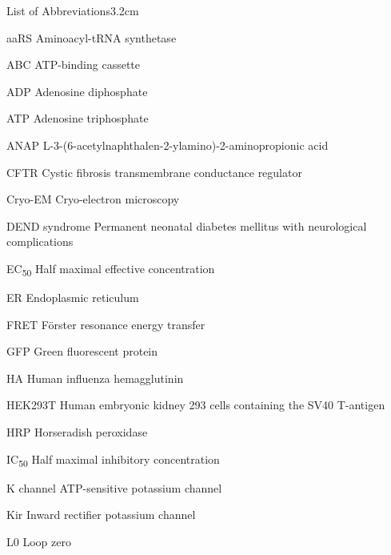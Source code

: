 \graphicspath{{figures/appendix/}}

\begin{mclistof}{List of Abbreviations}{3.2cm}

\item[aaRS] Aminoacyl-tRNA synthetase

\item[ABC] ATP-binding cassette

\item[ADP] Adenosine diphosphate

\item[ATP] Adenosine triphosphate

\item[ANAP] L-3-(6-acetylnaphthalen-2-ylamino)-2-aminopropionic acid

\item[CFTR] Cystic fibrosis transmembrane conductance regulator

\item[Cryo-EM] Cryo-electron microscopy

\item[DEND syndrome] Permanent neonatal diabetes mellitus with neurological complications

\item[EC\textsubscript{50}] Half maximal effective concentration

\item[ER] Endoplasmic reticulum

\item[FRET] F\"{o}rster resonance energy transfer

\item[GFP] Green fluorescent protein

\item[HA] Human influenza hemagglutinin

\item[HEK293T] Human embryonic kidney 293 cells containing the SV40 T-antigen

\item[HRP] Horseradish peroxidase

\item[IC\textsubscript{50}] Half maximal inhibitory concentration

\item[K\ATP{} channel] ATP-sensitive potassium channel

\item[Kir] Inward rectifier potassium channel

\item[L0] Loop zero


\end{mclistof}
